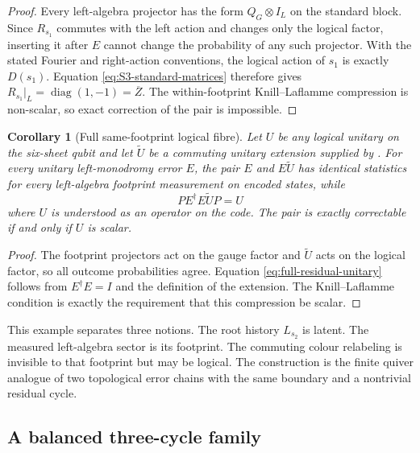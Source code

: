 \documentclass[11pt]{article}
\newtheorem{corollary}[theorem]{Corollary}
\theoremstyle{definition}
\theoremstyle{remark}
\newcommand{\diag}{\operatorname{diag}}
\begin{document}
\begin{proof}
Every left-algebra projector has the form $Q_G\otimes I_L$ on the standard block.  Since $R_{s_1}$ commutes with the left action and changes only the logical factor, inserting it after $E$ cannot change the probability of any such projector.  With the stated Fourier and right-action conventions, the logical action of $s_1$ is exactly $D(s_1)$.  Equation \eqref{eq:S3-standard-matrices} therefore gives $R_{s_1}|_L=\diag(1,-1)=\overline Z$.  The within-footprint Knill--Laflamme compression is non-scalar, so exact correction of the pair is impossible.
\end{proof}

\begin{corollary}[Full same-footprint logical fibre]\label{cor:full-same-footprint-fibre}
Let $U$ be any logical unitary on the six-sheet qubit and let $\widetilde U$ be a commuting unitary extension supplied by .  For every unitary left-monodromy error $E$, the pair $E$ and $E\widetilde U$ has identical statistics for every left-algebra footprint measurement on encoded states, while
\begin{equation}\label{eq:full-residual-unitary}
 PE^\dagger E\widetilde U P=U
\end{equation}
where $U$ is understood as an operator on the code.  The pair is exactly correctable if and only if $U$ is scalar.
\end{corollary}

\begin{proof}
The footprint projectors act on the gauge factor and $\widetilde U$ acts on the logical factor, so all outcome probabilities agree.  Equation \eqref{eq:full-residual-unitary} follows from $E^\dagger E=I$ and the definition of the extension.  The Knill--Laflamme condition is exactly the requirement that this compression be scalar.
\end{proof}

This example separates three notions.  The root history $L_{s_2}$ is latent.  The measured left-algebra sector is its footprint.  The commuting colour relabeling is invisible to that footprint but may be logical.  The construction is the finite quiver analogue of two topological error chains with the same boundary and a nontrivial residual cycle.

\subsection{A balanced three-cycle family}\label{sec:balanced}
\end{document}
